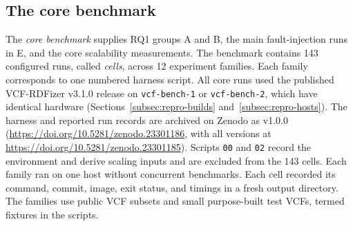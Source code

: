 \documentclass[11pt]{article}
\begin{document}
\subsection{The core benchmark}\label{subsec:repro-campaign}
The \emph{core benchmark} supplies RQ1 groups A and B, the main fault-injection runs in E, and the core scalability measurements.
The benchmark contains 143 configured runs, called \emph{cells}, across 12 experiment families.
Each family corresponds to one numbered harness script.
All core runs used the published VCF-RDFizer v3.1.0 release on \texttt{vcf-bench-1} or \texttt{vcf-bench-2}, which have identical hardware (Sections~\ref{subsec:repro-builds} and~\ref{subsec:repro-hosts}).
The harness and reported run records are archived on Zenodo as v1.0.0 (\url{https://doi.org/10.5281/zenodo.23301186}, with all versions at \url{https://doi.org/10.5281/zenodo.23301185}).
Scripts \texttt{00} and \texttt{02} record the environment and derive scaling inputs and are excluded from the 143 cells.
Each family ran on one host without concurrent benchmarks.
Each cell recorded its command, commit, image, exit status, and timings in a fresh output directory.
The families use public VCF subsets and small purpose-built test VCFs, termed fixtures in the scripts.
\end{document}
